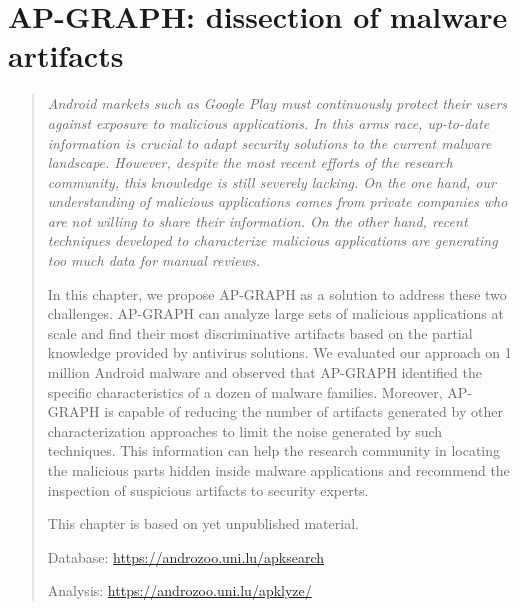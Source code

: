 \chapter{AP-GRAPH: dissection of malware artifacts}
\label{chapter:apgraph}

\begin{quote}
{\itshape
Android markets such as Google Play must continuously protect their users against exposure to malicious applications. In this arms race, up-to-date information is crucial to adapt security solutions to the current malware landscape. However, despite the most recent efforts of the research community, this knowledge is still severely lacking. On the one hand, our understanding of malicious applications comes from private companies who are not willing to share their information. On the other hand, recent techniques developed to characterize malicious applications are generating too much data for manual reviews.

In this chapter, we propose AP-GRAPH as a solution to address these two challenges. AP-GRAPH can analyze large sets of malicious applications at scale and find their most discriminative artifacts based on the partial knowledge provided by antivirus solutions. We evaluated our approach on 1 million Android malware and observed that AP-GRAPH identified the specific characteristics of a dozen of malware families. Moreover, AP-GRAPH is capable of reducing the number of artifacts generated by other characterization approaches to limit the noise generated by such techniques. This information can help the research community in locating the malicious parts hidden inside malware applications and recommend the inspection of suspicious artifacts to security experts.

\vspace{1cm}

\begin{center}
This chapter is based on yet unpublished material.

Database: \url{https://androzoo.uni.lu/apksearch}

Analysis: \url{https://androzoo.uni.lu/apklyze/}
\end{center}
}
\end{quote}

\localtableofcontents{}


